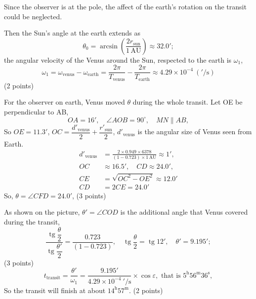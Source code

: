 Since the observer is at the pole, the affect of the earth's rotation on the
transit could be neglected.

Then the Sun's angle at the earth extends as
\[
\theta_0 = \arcsin\!\left(\frac{2r_{\mathrm{sun}}}{1\,\mathrm{AU}}\right)
 \approx 32.0';
\]
the angular velocity of the Venus around the Sun, respected to the earth is
$\omega_1$,
\[
\omega_1 = \omega_{\mathrm{venus}} - \omega_{\mathrm{earth}}
 = \frac{2\pi}{T_{\mathrm{venus}}} - \frac{2\pi}{T_{\mathrm{earth}}}
 \approx 4.29\times 10^{-4}\ ('/\mathrm{s})
\]
\hfill(2 points)

For the observer on earth, Venus moved $\theta$ during the whole transit. Let
OE be perpendicular to AB,
\[
OA = 16', \quad \angle AOB = 90^\circ, \quad MN \parallel AB,
\]
So $OE = 11.3'$,
$OC = \dfrac{d'_{\mathrm{venus}}}{2} + \dfrac{r'_{\mathrm{sun}}}{2}$,
$d'_{\mathrm{venus}}$ is the angular size of Venus seen from Earth.
\begin{align*}
d'_{\mathrm{venus}} &= \frac{2\times 0.949\times 6378}
                           {(1-0.723)\times 1\,\mathrm{AU}} \approx 1',\\
OC &\approx 16.5', \quad CD \approx 24.0',\\
CE &= \sqrt{OC^2 - OE^2} \approx 12.0'\\
CD &= 2CE = 24.0'
\end{align*}
So, $\theta = \angle CFD = 24.0'$, \hfill(3 points)

As shown on the picture, $\theta' = \angle COD$ is the additional angle that
Venus covered during the transit,
\[
\frac{\operatorname{tg}\dfrac{\theta}{2}}{\operatorname{tg}\dfrac{\theta'}{2}}
 = \frac{0.723}{(1-0.723)}, \quad
\operatorname{tg}\frac{\theta}{2} = \operatorname{tg} 12', \quad
\theta' = 9.195';
\]
\hfill(3 points)
\[
t_{\mathrm{transit}} = \frac{\theta'}{\omega_1}
 = \frac{9.195'}{4.29\times 10^{-4}\ '/\mathrm{s}}\times\cos\varepsilon,
 \text{ that is } 5^{\mathrm{h}}56^{\mathrm{m}}36^{\mathrm{s}},
\]
So the transit will finish at about $14^{\mathrm{h}}57^{\mathrm{m}}$.
\hfill(2 points)
